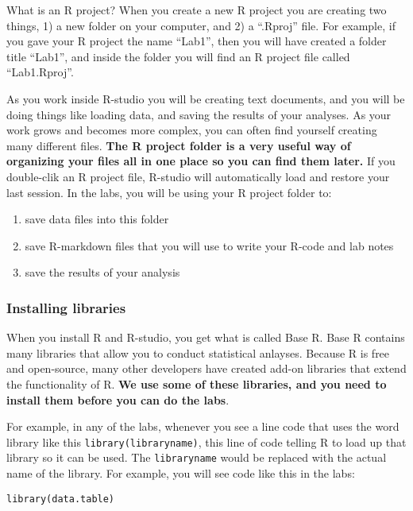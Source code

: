 \documentclass[
]{book}
\providecommand{\tightlist}{%
  \setlength{\itemsep}{0pt}\setlength{\parskip}{0pt}}
\begin{document}
What is an R project? When you create a new R project you are creating two things, 1) a new folder on your computer, and 2) a ``.Rproj'' file. For example, if you gave your R project the name ``Lab1'', then you will have created a folder title ``Lab1'', and inside the folder you will find an R project file called ``Lab1.Rproj''.

As you work inside R-studio you will be creating text documents, and you will be doing things like loading data, and saving the results of your analyses. As your work grows and becomes more complex, you can often find yourself creating many different files. \textbf{The R project folder is a very useful way of organizing your files all in one place so you can find them later.} If you double-clik an R project file, R-studio will automatically load and restore your last session. In the labs, you will be using your R project folder to:

\begin{enumerate}
\def\labelenumi{\arabic{enumi}.}
\tightlist
\item
  save data files into this folder
\item
  save R-markdown files that you will use to write your R-code and lab notes
\item
  save the results of your analysis
\end{enumerate}

\hypertarget{installing-libraries}{%
\subsubsection{Installing libraries}\label{installing-libraries}}

When you install R and R-studio, you get what is called Base R. Base R contains many libraries that allow you to conduct statistical anlayses. Because R is free and open-source, many other developers have created add-on libraries that extend the functionality of R. \textbf{We use some of these libraries, and you need to install them before you can do the labs}.

For example, in any of the labs, whenever you see a line code that uses the word library like this \texttt{library(libraryname)}, this line of code telling R to load up that library so it can be used. The \texttt{libraryname} would be replaced with the actual name of the library. For example, you will see code like this in the labs:

\begin{verbatim}
library(data.table)
\end{verbatim}
\end{document}
